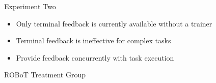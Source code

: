 \documentclass[10pt]{beamer}
\begin{document}
\begin{frame}[fragile]{Experiment Two}
  \begin{itemize}
    \setlength\itemsep{1em}
    \item Only terminal feedback is currently available without a trainer
    \item Terminal feedback is ineffective for complex tasks
    \item Provide feedback concurrently with task execution
  \end{itemize}
\end{frame}

\begin{frame}[fragile]{ROBoT Treatment Group}
\begin{figure}
  \begin{center}


  \end{center}
\end{figure}
\end{frame}
\end{document}
